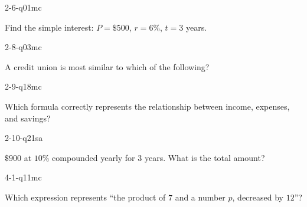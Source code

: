 \begin{practiceQuestion}{2-6-q01}{mc}
\begin{questionText}
Find the simple interest: $P = \$500$, $r = 6\%$, $t = 3$ years.
\end{questionText}
\end{practiceQuestion}

\begin{practiceQuestion}{2-8-q03}{mc}
\begin{questionText}
A credit union is most similar to which of the following?
\end{questionText}
\end{practiceQuestion}

\begin{practiceQuestion}{2-9-q18}{mc}
\begin{questionText}
Which formula correctly represents the relationship between income, expenses, and savings?
\end{questionText}
\end{practiceQuestion}

\begin{practiceQuestion}{2-10-q21}{sa}
\begin{questionText}
$\$900$ at $10\%$ compounded yearly for $3$ years. What is the total amount?
\end{questionText}
\end{practiceQuestion}

\begin{practiceQuestion}{4-1-q11}{mc}
\begin{questionText}
Which expression represents ``the product of $7$ and a number $p$, decreased by $12$''?
\end{questionText}
\end{practiceQuestion}

